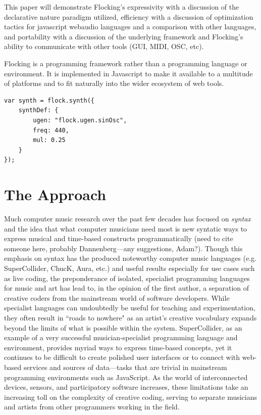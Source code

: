 \documentclass{article}
\begin{document}
This paper will demonstrate Flocking's expressivity with a discussion of the declarative nature paradigm utilized, efficiency with a discussion of optimization tactics for javascript webaudio languages and a comparison with other languages, and portability with a discussion of the underlying framework and Flocking's ability to communicate with other tools (GUI, MIDI, OSC, etc).

Flocking is a programming framework rather than a programming language or environment. It is implemented in Javascript to make it available to a multitude of platforms and to fit naturally into the wider ecosystem of web tools.


\begin{verbatim}
var synth = flock.synth({
    synthDef: {
        ugen: "flock.ugen.sinOsc",
        freq: 440,
        mul: 0.25
    }
});

\end{verbatim}

\section{The Approach}

Much computer music research over the past few decades has focused on {\it syntax} and the idea that what computer musicians need most is new syntatic ways to express musical and time-based constructs programmatically (need to cite someone here, probably Dannenberg---any suggestions, Adam?). Though this emphasis on syntax has the produced noteworthy computer music languages (e.g. SuperCollider, ChucK, Aura, etc.) and useful results especially for use cases such as live coding, the preponderance of isolated, specialist programming languages for music and art has lead to, in the opinion of the first author, a separation of creative coders from the mainstream world of software developers. While specialist languages can undoubtedly be useful for teaching and experimentation, they often result in ``roads to nowhere" as an artist's creative vocabulary expands beyond the limits of what is possible within the system. SuperCollider, as an example of a very successful musician-specialist programming language and environment, provides myriad ways to express time-based concepts, yet it continues to be difficult to create polished user interfaces or to connect with web-based services and sources of data---tasks that are trivial in mainstream programming environments such as JavaScript. As the world of interconnected devices, sensors, and participatory software increases, these limitations take an increasing toll on the complexity of creative coding, serving to separate musicians and artists from other programmers working in the field.
\end{document}
